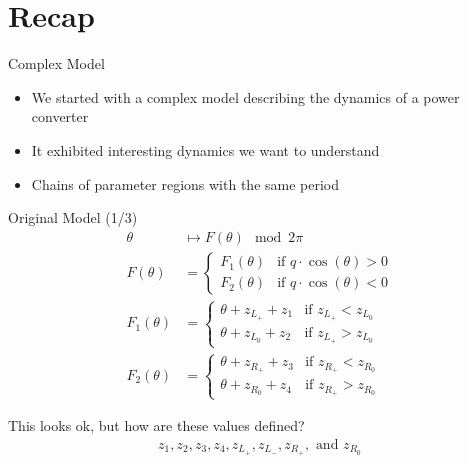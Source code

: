 \section{Recap}

\begin{frame}{Complex Model}
	\begin{itemize}
		\item We started with a complex model describing the dynamics of a power converter
		\item It exhibited interesting dynamics we want to understand
		\item Chains of parameter regions with the same period
	\end{itemize}
	\vspace{-1em}
	\begin{figure}
	\end{figure}
\end{frame}

\begin{frame}{Original Model (1/3)}
	\vspace{-2.0em}
	\begin{align}
		\theta      & \mapsto  F(\theta) \mod 2 \pi
		\\
		F(\theta)   & = \begin{cases}
			                F_1(\theta) & \text{if } q \cdot \cos(\theta) > 0 \\
			                F_2(\theta) & \text{if } q \cdot \cos(\theta) < 0
		                \end{cases}
		\\
		F_1(\theta) & = \begin{cases}
			                \theta + z_{L_+} + z_1 & \text{if } z_{L_+} < z_{L_0} \\
			                \theta + z_{L_0} + z_2 & \text{if } z_{L_+} > z_{L_0}
		                \end{cases}
		\\
		F_2(\theta) & = \begin{cases}
			                \theta + z_{R_+} + z_3 & \text{if } z_{R_+} < z_{R_0} \\
			                \theta + z_{R_0} + z_4 & \text{if } z_{R_+} > z_{R_0}
		                \end{cases}
	\end{align}

	\pause
	\vspace{2em}
	This looks ok, but how are these values defined?
	\begin{align*}
		z_1, z_2, z_3, z_4, z_{L_+}, z_{L_-}, z_{R_+}, \text{ and } z_{R_0}
	\end{align*}
\end{frame}

